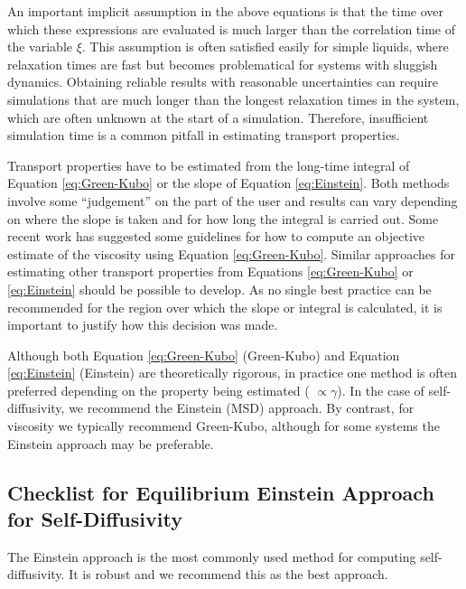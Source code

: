 \documentclass[9pt]{livecoms}
\begin{document}
An important implicit assumption in the above equations is that the time over which these expressions are evaluated is much larger than the correlation time of the variable $\xi$. This assumption is often satisfied easily for simple liquids, where relaxation times are fast but becomes problematical for systems with sluggish dynamics. Obtaining reliable results with reasonable uncertainties can require simulations that are much longer than the longest relaxation times in the system, which are often unknown at the start of a simulation. Therefore, insufficient simulation time is a common pitfall in estimating transport properties.

Transport properties have to be estimated from the long-time integral of Equation \ref{eq:Green-Kubo} or the slope of Equation \ref{eq:Einstein}. Both methods involve some “judgement” on the part of the user and results can vary depending on where the slope is taken and for how long the integral is carried out. Some recent work has suggested some guidelines for how to compute an objective estimate of the viscosity using Equation \ref{eq:Green-Kubo}. Similar approaches for estimating other transport properties from Equations \ref{eq:Green-Kubo} or \ref{eq:Einstein} should be possible to develop. As no single best practice can be recommended for the region over which the slope or integral is calculated, it is important to justify how this decision was made.

Although both Equation \ref{eq:Green-Kubo} (Green-Kubo) and Equation \ref{eq:Einstein} (Einstein) are theoretically rigorous, in practice one method is often preferred depending on the property being estimated ( $\propto \gamma$). In the case of self-diffusivity, we recommend the Einstein (MSD) approach. By contrast, for viscosity we typically recommend Green-Kubo, although for some systems the Einstein approach may be preferable.

\subsection{Checklist for Equilibrium Einstein Approach for Self-Diffusivity}


The Einstein approach is the most commonly used method for computing self-diffusivity. It is robust and we recommend this as the best approach.
\end{document}
